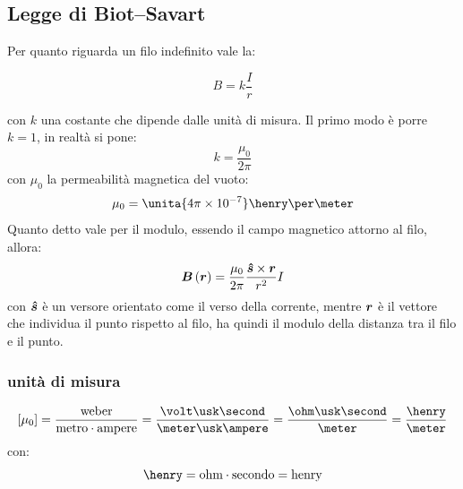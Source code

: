 \subsection{Legge di Biot--Savart}
Per quanto riguarda un filo indefinito vale la:
\begin{legge}
\begin{equation}
B=k\frac{I}{r}
\end{equation}
\end{legge}
con $k$ una costante che dipende dalle unità di misura. Il primo modo è porre $k=1$, in realtà si pone:
\begin{equation*}k=\frac{\mu_0}{2\pi}\end{equation*}
con $\mu_0$ la permeabilità magnetica del vuoto:
\begin{equation*}\mu_0=\unita{4\pi\times 10^{-7}}\henry\per\meter\end{equation*}
Quanto detto vale per il modulo, essendo il campo magnetico attorno al filo, allora:
\begin{equation*}\boldsymbol{B}\left(\boldsymbol{r}\right)=\frac{\mu_0}{2\pi}\frac{\boldsymbol{\hat {s}}\times\boldsymbol{r}}{r^2}I\end{equation*}
con $\boldsymbol{\hat {s}}$ è un versore orientato come il verso della corrente, mentre $\boldsymbol{r}$ è il vettore che individua il punto rispetto al filo, ha quindi il modulo della distanza tra il filo e il punto.
\subsubsection{unità di misura}
\begin{equation*}\left[\mu_0\right]=\frac{\text{weber}}{\text{metro}\cdot\text{ampere}}=\frac{\volt\usk\second}{\meter\usk\ampere}=\frac{\ohm\usk\second}{\meter}=\frac{\henry}{\meter}\end{equation*}
con:
\begin{equation*}\henry=\text{ohm}\cdot\text{secondo}=\text{henry}\end{equation*}
